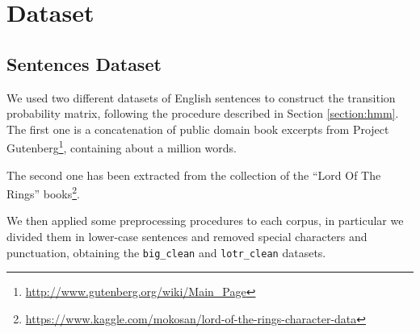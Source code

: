 \chapter{Dataset}

\section{Sentences Dataset}
\label{section:sentences_ds}
We used two different datasets of English sentences to construct the transition probability matrix, following the 
procedure described in Section \ref{section:hmm}.\\
The first one is a concatenation of public domain book excerpts from Project 
Gutenberg\footnote{\url{http://www.gutenberg.org/wiki/Main\_Page}}, containing about a million words. 

The second one has been extracted from the collection  of the “Lord Of The Rings” 
books\footnote{\url{https://www.kaggle.com/mokosan/lord-of-the-rings-character-data}}.

We then applied some preprocessing procedures to each corpus, in particular we divided them in lower-case 
sentences and removed special characters and punctuation, obtaining the \texttt{big\_clean} and 
\texttt{lotr\_clean} datasets.



